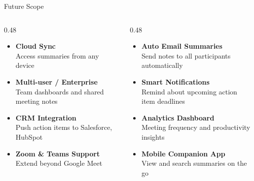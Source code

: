 \documentclass[aspectratio=169]{beamer}
\newcommand{\hl}[1]{\textcolor{accentlight}{\textbf{#1}}}
\begin{document}
\begin{frame}{Future Scope}
  \begin{columns}[T]
    \begin{column}{0.48\textwidth}
      \begin{itemize}
        \item \hl{Cloud Sync}\\
              \small Access summaries from any device
        \vspace{0.25cm}
        \item \hl{Multi-user / Enterprise}\\
              \small Team dashboards and shared meeting notes
        \vspace{0.25cm}
        \item \hl{CRM Integration}\\
              \small Push action items to Salesforce, HubSpot
        \vspace{0.25cm}
        \item \hl{Zoom \& Teams Support}\\
              \small Extend beyond Google Meet
      \end{itemize}
    \end{column}
    \begin{column}{0.48\textwidth}
      \begin{itemize}
        \item \hl{Auto Email Summaries}\\
              \small Send notes to all participants automatically
        \vspace{0.25cm}
        \item \hl{Smart Notifications}\\
              \small Remind about upcoming action item deadlines
        \vspace{0.25cm}
        \item \hl{Analytics Dashboard}\\
              \small Meeting frequency and productivity insights
        \vspace{0.25cm}
        \item \hl{Mobile Companion App}\\
              \small View and search summaries on the go
      \end{itemize}
    \end{column}
  \end{columns}
\end{frame}
\end{document}
